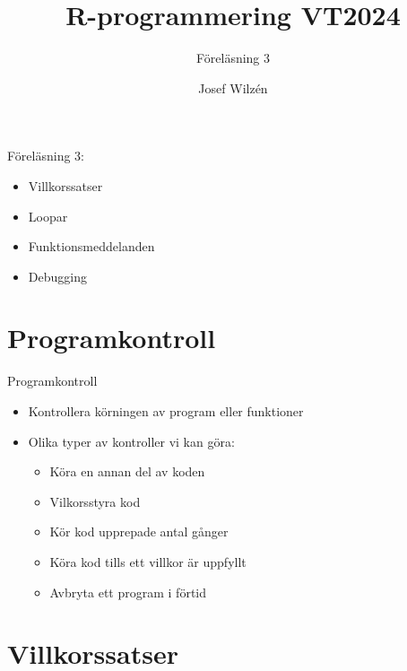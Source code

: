\documentclass[
  11pt,
  ignorenonframetext,
]{beamer}
\title{R-programmering VT2024}
\subtitle{Föreläsning 3}
\author{Josef Wilzén}
\date{}
\institute{Linköpings Universitet}
\providecommand{\tightlist}{%
  \setlength{\itemsep}{0pt}\setlength{\parskip}{0pt}}
\begin{document}
\frame{\titlepage}

\begin{frame}{Föreläsning 3:}
\label{fuxf6reluxe4sning-3}
\begin{itemize}
\tightlist
\item
  Villkorssatser
\item
  Loopar
\item
  Funktionsmeddelanden
\item
  Debugging
\end{itemize}
\end{frame}



\section{Programkontroll}\label{programkontroll}

\begin{frame}{Programkontroll}
\label{programkontroll-1}
\begin{itemize}
\tightlist
\item
  Kontrollera körningen av program eller funktioner
\item
  Olika typer av kontroller vi kan göra:

  \begin{itemize}
  \tightlist
  \item
    Köra en annan del av koden
  \item
    Vilkorsstyra kod
  \item
    Kör kod upprepade antal gånger
  \item
    Köra kod tills ett villkor är uppfyllt
  \item
    Avbryta ett program i förtid
  \end{itemize}
\end{itemize}
\end{frame}

\section{Villkorssatser}\label{villkorssatser}
\end{document}
